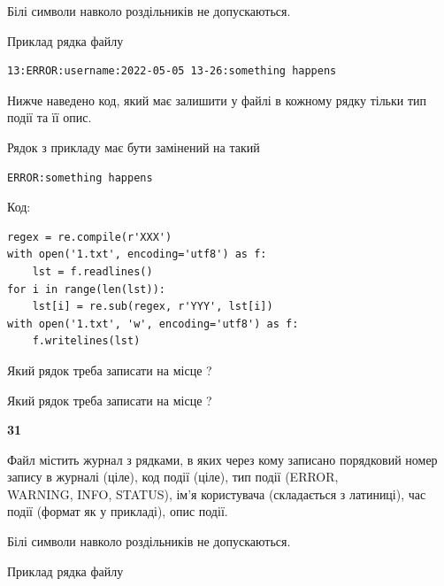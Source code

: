 Білі символи навколо роздільників не допускаються.

Приклад рядка файлу



\begin{verbatim}
13:ERROR:username:2022-05-05 13-26:something happens
\end{verbatim}


Нижче наведено код, який має залишити у файлі в кожному рядку тільки тип події та її опис.

Рядок з прикладу має бути замінений на такий



\begin{verbatim}
ERROR:something happens
\end{verbatim}




Код:



\begin{verbatim}
regex = re.compile(r'XXX')
with open('1.txt', encoding='utf8') as f:
    lst = f.readlines()
for i in range(len(lst)):
    lst[i] = re.sub(regex, r'YYY', lst[i])
with open('1.txt', 'w', encoding='utf8') as f:
    f.writelines(lst)
\end{verbatim}









Який рядок треба записати на місце  ?\par
\vspace{5mm}


Який рядок треба записати на місце  ?\par


\newpage

{\begin {center}\textbf{ 31}\end {center}}\par
Файл  містить журнал з рядками, в яких через кому записано поряд\-ко\-вий номер запису в журналі (ціле), код події (ціле), тип події (ERROR, \\WARNING, INFO, STATUS), ім'я користувача (складається з латиниці), час події (фор\-мат як у прикладі), опис події.

Білі символи навколо роздільників не допускаються.

Приклад рядка файлу




